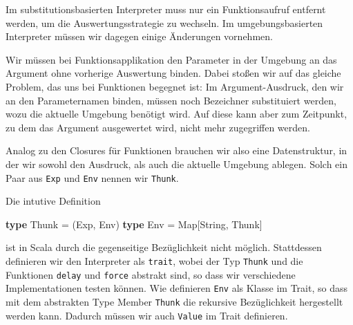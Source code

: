 \documentclass[]{article}
\newenvironment{Shaded}{}{}
\newcommand{\KeywordTok}[1]{\textcolor[rgb]{0.00,0.44,0.13}{\textbf{#1}}}
\newcommand{\NormalTok}[1]{#1}
\begin{document}
Im substitutionsbasierten Interpreter muss nur ein Funktionsaufruf
entfernt werden, um die Auswertungsstrategie zu wechseln. Im
umgebungsbasierten Interpreter müssen wir dagegen einige Änderungen
vornehmen.

Wir müssen bei Funktionsapplikation den Parameter in der Umgebung an das
Argument ohne vorherige Auswertung binden. Dabei stoßen wir auf das
gleiche Problem, das uns bei Funktionen begegnet ist: Im
Argument-Ausdruck, den wir an den Parameternamen binden, müssen noch
Bezeichner substituiert werden, wozu die aktuelle Umgebung benötigt
wird. Auf diese kann aber zum Zeitpunkt, zu dem das Argument ausgewertet
wird, nicht mehr zugegriffen werden.

Analog zu den Closures für Funktionen brauchen wir also eine
Datenstruktur, in der wir sowohl den Ausdruck, als auch die aktuelle
Umgebung ablegen. Solch ein Paar aus \texttt{Exp} und \texttt{Env}
nennen wir \texttt{Thunk}.

Die intutive Definition

\begin{Shaded}
\begin{Highlighting}[]
\KeywordTok{type}\NormalTok{ Thunk = (Exp, Env)}
\KeywordTok{type}\NormalTok{ Env = Map[String, Thunk]}
\end{Highlighting}
\end{Shaded}

ist in Scala durch die gegenseitige Bezüglichkeit nicht möglich.
Stattdessen definieren wir den Interpreter als \texttt{trait}, wobei der
Typ \texttt{Thunk} und die Funktionen \texttt{delay} und \texttt{force}
abstrakt sind, so dass wir verschiedene Implementationen testen können.
Wie definieren \texttt{Env} als Klasse im Trait, so dass mit dem
abstrakten Type Member \texttt{Thunk} die rekursive Bezüglichkeit
hergestellt werden kann. Dadurch müssen wir auch \texttt{Value} im Trait
definieren.
\end{document}
